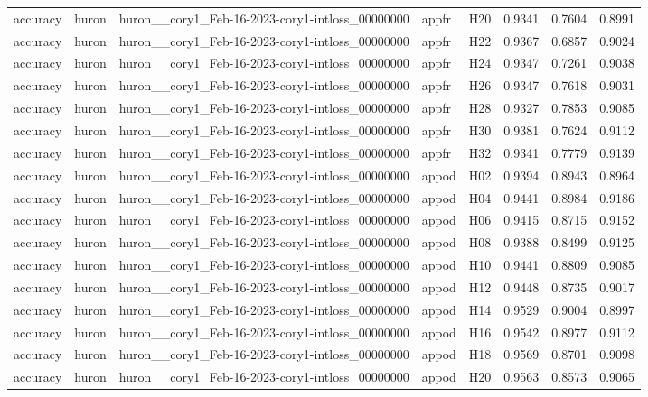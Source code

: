 \begin{table}[tbp]
\begin{tabular}{lllllrrr}
accuracy & huron & huron\_\_cory1\_Feb-16-2023-cory1-intloss\_00000000 & appfr & H20 & 0.9341 & 0.7604 & 0.8991 \\
accuracy & huron & huron\_\_cory1\_Feb-16-2023-cory1-intloss\_00000000 & appfr & H22 & 0.9367 & 0.6857 & 0.9024 \\
accuracy & huron & huron\_\_cory1\_Feb-16-2023-cory1-intloss\_00000000 & appfr & H24 & 0.9347 & 0.7261 & 0.9038 \\
accuracy & huron & huron\_\_cory1\_Feb-16-2023-cory1-intloss\_00000000 & appfr & H26 & 0.9347 & 0.7618 & 0.9031 \\
accuracy & huron & huron\_\_cory1\_Feb-16-2023-cory1-intloss\_00000000 & appfr & H28 & 0.9327 & 0.7853 & 0.9085 \\
accuracy & huron & huron\_\_cory1\_Feb-16-2023-cory1-intloss\_00000000 & appfr & H30 & 0.9381 & 0.7624 & 0.9112 \\
accuracy & huron & huron\_\_cory1\_Feb-16-2023-cory1-intloss\_00000000 & appfr & H32 & 0.9341 & 0.7779 & 0.9139 \\
accuracy & huron & huron\_\_cory1\_Feb-16-2023-cory1-intloss\_00000000 & appod & H02 & 0.9394 & 0.8943 & 0.8964 \\
accuracy & huron & huron\_\_cory1\_Feb-16-2023-cory1-intloss\_00000000 & appod & H04 & 0.9441 & 0.8984 & 0.9186 \\
accuracy & huron & huron\_\_cory1\_Feb-16-2023-cory1-intloss\_00000000 & appod & H06 & 0.9415 & 0.8715 & 0.9152 \\
accuracy & huron & huron\_\_cory1\_Feb-16-2023-cory1-intloss\_00000000 & appod & H08 & 0.9388 & 0.8499 & 0.9125 \\
accuracy & huron & huron\_\_cory1\_Feb-16-2023-cory1-intloss\_00000000 & appod & H10 & 0.9441 & 0.8809 & 0.9085 \\
accuracy & huron & huron\_\_cory1\_Feb-16-2023-cory1-intloss\_00000000 & appod & H12 & 0.9448 & 0.8735 & 0.9017 \\
accuracy & huron & huron\_\_cory1\_Feb-16-2023-cory1-intloss\_00000000 & appod & H14 & 0.9529 & 0.9004 & 0.8997 \\
accuracy & huron & huron\_\_cory1\_Feb-16-2023-cory1-intloss\_00000000 & appod & H16 & 0.9542 & 0.8977 & 0.9112 \\
accuracy & huron & huron\_\_cory1\_Feb-16-2023-cory1-intloss\_00000000 & appod & H18 & 0.9569 & 0.8701 & 0.9098 \\
accuracy & huron & huron\_\_cory1\_Feb-16-2023-cory1-intloss\_00000000 & appod & H20 & 0.9563 & 0.8573 & 0.9065 \\

\end{tabular}
\end{table}
